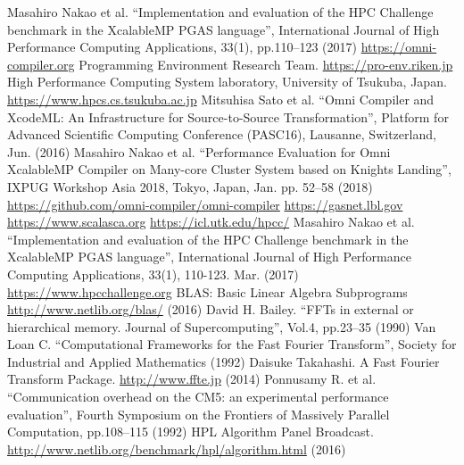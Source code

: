 \begin{thebibliography}{99.}%
%
%
 Masahiro Nakao et al.
``Implementation and evaluation of the HPC Challenge benchmark in the XcalableMP PGAS language'', International Journal of High Performance Computing Applications, 33(1), pp.110--123 (2017)
%
 \url{https://omni-compiler.org}
%
 Programming Environment Research Team.
\url{https://pro-env.riken.jp}
%
 High Performance Computing System laboratory, University of Tsukuba, Japan.
\url{https://www.hpcs.cs.tsukuba.ac.jp}
%
 Mitsuhisa Sato et al.
  ``Omni Compiler and XcodeML: An Infrastructure for Source-to-Source Transformation'',
  Platform for Advanced Scientific Computing Conference (PASC16), Lausanne, Switzerland, Jun. (2016)
 Masahiro Nakao et al.
  ``Performance Evaluation for Omni XcalableMP Compiler on Many-core Cluster System based on Knights Landing'',
  IXPUG Workshop Asia 2018, Tokyo, Japan, Jan. pp. 52--58 (2018)
%
 \url{https://github.com/omni-compiler/omni-compiler}
%
%
 \url{https://gasnet.lbl.gov}
%
 \url{https://www.scalasca.org}
%
 \url{https://icl.utk.edu/hpcc/}
%
 Masahiro Nakao et al.
``Implementation and evaluation of the HPC Challenge benchmark in the XcalableMP PGAS language'',
  International Journal of High Performance Computing Applications, 33(1), 110-123. Mar. (2017)
%
 \url{https://www.hpcchallenge.org}%
%
 BLAS: Basic Linear Algebra Subprograms \url{http://www.netlib.org/blas/} (2016)
%
 David H. Bailey.
  ``FFTs in external or hierarchical memory. Journal of Supercomputing'',
  Vol.4, pp.23--35 (1990)
%
 Van Loan C.
  ``Computational Frameworks for the Fast Fourier Transform'',
  Society for Industrial and Applied Mathematics (1992)
%
 Daisuke Takahashi.
  A Fast Fourier Transform Package. \url{http://www.ffte.jp} (2014)
%
 Ponnusamy R. et al.
  ``Communication overhead on the CM5: an experimental performance evaluation'',
  Fourth Symposium on the Frontiers of Massively Parallel Computation, pp.108--115 (1992)
%
 HPL Algorithm Panel Broadcast. \url{http://www.netlib.org/benchmark/hpl/algorithm.html} (2016)

\end{thebibliography}
